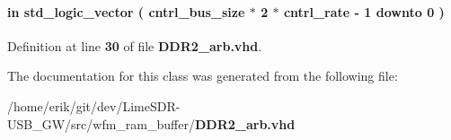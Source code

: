 \paragraph[{wcmd\+\_\+fifo\+\_\+wrdata}]{ {\bfseries \textcolor{keywordflow}{in}\textcolor{vhdlchar}{ }} {\bfseries \textcolor{comment}{std\+\_\+logic\+\_\+vector}\textcolor{vhdlchar}{ }\textcolor{vhdlchar}{(}\textcolor{vhdlchar}{ }\textcolor{vhdlchar}{ }\textcolor{vhdlchar}{ }\textcolor{vhdlchar}{ }{\bfseries {\bf cntrl\+\_\+bus\+\_\+size}} \textcolor{vhdlchar}{$\ast$}\textcolor{vhdlchar}{ } \textcolor{vhdldigit}{2} \textcolor{vhdlchar}{$\ast$}\textcolor{vhdlchar}{ }\textcolor{vhdlchar}{ }\textcolor{vhdlchar}{ }{\bfseries {\bf cntrl\+\_\+rate}} \textcolor{vhdlchar}{-\/}\textcolor{vhdlchar}{ } \textcolor{vhdldigit}{1} \textcolor{vhdlchar}{ }\textcolor{keywordflow}{downto}\textcolor{vhdlchar}{ }\textcolor{vhdlchar}{ } \textcolor{vhdldigit}{0} \textcolor{vhdlchar}{ }\textcolor{vhdlchar}{)}\textcolor{vhdlchar}{ }} \hspace{0.3cm}{\ttfamily [Port]}}\label{classDDR2__arb_ad690f93d82f13565334781afea183ae8}


Definition at line {\bf 30} of file {\bf D\+D\+R2\+\_\+arb.\+vhd}.



The documentation for this class was generated from the following file\+:\begin{DoxyCompactItemize}
\item 
/home/erik/git/dev/\+Lime\+S\+D\+R-\/\+U\+S\+B\+\_\+\+G\+W/src/wfm\+\_\+ram\+\_\+buffer/{\bf D\+D\+R2\+\_\+arb.\+vhd}\end{DoxyCompactItemize}
